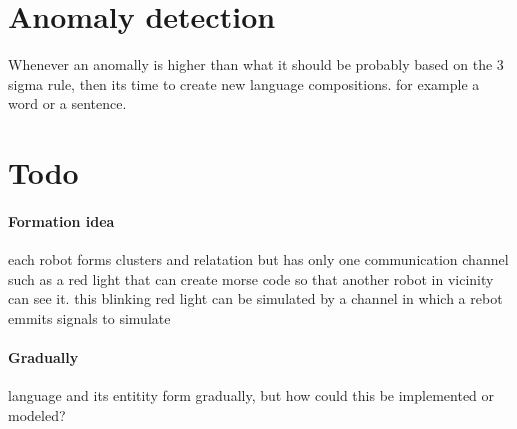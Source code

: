 \section{Anomaly detection}
Whenever an anomally is higher than what it should be probably based on the 3 sigma rule, then its time to create new language compositions. for example a word or a sentence.


\section{Todo}
    \paragraph{Formation idea}
        each robot  forms clusters and relatation but has only one communication channel such as a red light that can create morse code so that another robot in vicinity can see it. this blinking red light can be simulated by a channel in which a rebot emmits signals to simulate
    
    \paragraph{Gradually}
        language and its entitity form gradually, but how could this be implemented or modeled?


